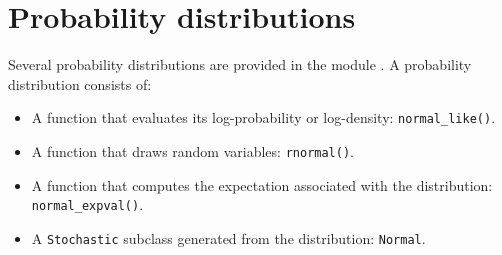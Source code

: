 \documentclass[]{jss}
\begin{document}
\section[Distributions]{Probability distributions} 
\label{sec:distributions}
Several probability distributions are provided in the module . A probability distribution consists of:
\begin{itemize}
    \item A function that evaluates its log-probability or log-density: \texttt{normal_like()}.
    \item A function that draws random variables: \texttt{rnormal()}.
    \item A function that computes the expectation associated with the distribution: \texttt{normal_expval()}.
    \item A \texttt{Stochastic} subclass generated from the distribution: \texttt{Normal}.
\end{itemize} 




\end{document}
